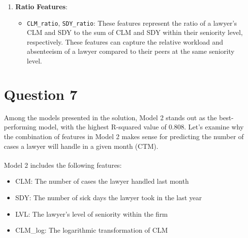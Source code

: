 \documentclass{article}
\begin{document}
\begin{enumerate}
    \item \textbf{Ratio Features}:
    \begin{itemize}
        \item \texttt{CLM\_ratio}, \texttt{SDY\_ratio}: These features represent the ratio of a lawyer's CLM and SDY to the sum of CLM and SDY within their seniority level, respectively. These features can capture the relative workload and absenteeism of a lawyer compared to their peers at the same seniority level.
    \end{itemize}
\end{enumerate}

\section*{Question 7}
Among the models presented in the solution, Model 2 stands out as the best-performing model, with the highest R-squared value of 0.808. Let's examine why the combination of features in Model 2 makes sense for predicting the number of cases a lawyer will handle in a given month (CTM).
\\\\
Model 2 includes the following features:
\begin{itemize}
    \item CLM: The number of cases the lawyer handled last month
    \item SDY: The number of sick days the lawyer took in the last year
    \item LVL: The lawyer's level of seniority within the firm
    \item CLM\_log: The logarithmic transformation of CLM
\end{itemize}
\end{document}
